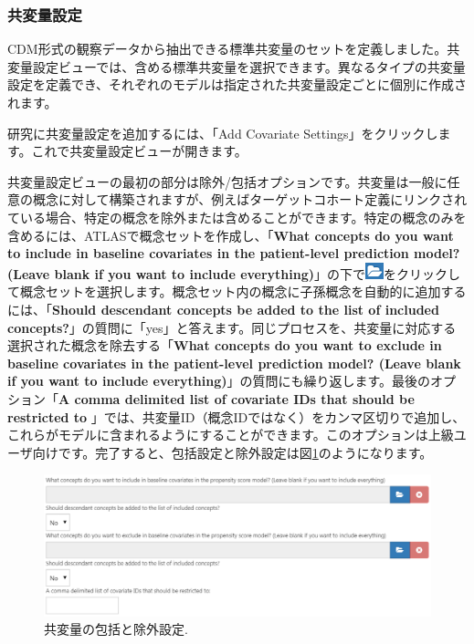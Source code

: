 \documentclass[
  11pt]{book}
\theoremstyle{definition}
\theoremstyle{definition}
\theoremstyle{definition}
\theoremstyle{definition}
\theoremstyle{remark}
\begin{document}
\subsubsection*{共変量設定}\label{ux5171ux5909ux91cfux8a2dux5b9a}

CDM形式の観察データから抽出できる標準共変量のセットを定義しました。共変量設定ビューでは、含める標準共変量を選択できます。異なるタイプの共変量設定を定義でき、それぞれのモデルは指定された共変量設定ごとに個別に作成されます。

研究に共変量設定を追加するには、「Add Covariate Settings」をクリックします。これで共変量設定ビューが開きます。

共変量設定ビューの最初の部分は除外/包括オプションです。共変量は一般に任意の概念に対して構築されますが、例えばターゲットコホート定義にリンクされている場合、特定の概念を除外または含めることができます。特定の概念のみを含めるには、ATLASで概念セットを作成し、「\textbf{What concepts do you want to include in baseline covariates in the patient-level prediction model? (Leave blank if you want to include everything)}」の下で\includegraphics{images/PopulationLevelEstimation/open.png}をクリックして概念セットを選択します。概念セット内の概念に子孫概念を自動的に追加するには、「\textbf{Should descendant concepts be added to the list of included concepts?}」の質問に「yes」と答えます。同じプロセスを、共変量に対応する選択された概念を除去する「\textbf{What concepts do you want to exclude in baseline covariates in the patient-level prediction model? (Leave blank if you want to include everything)}」の質問にも繰り返します。最後のオプション「\textbf{A comma delimited list of covariate IDs that should be restricted to} 」では、共変量ID（概念IDではなく）をカンマ区切りで追加し、これらがモデルに含まれるようにすることができます。このオプションは上級ユーザ向けです。完了すると、包括設定と除外設定は図\ref{fig:covariateSettings1}のようになります。

\begin{figure}

{\centering \includegraphics[width=1\linewidth]{images/PatientLevelPrediction/covariateSettings1} 

}

\caption{共変量の包括と除外設定.}\label{fig:covariateSettings1}
\end{figure}
\end{document}
